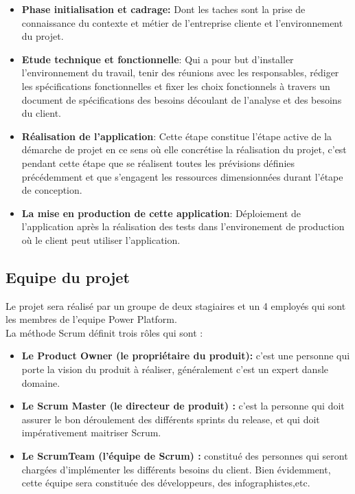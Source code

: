 \begin{itemize}
  \item \textbf{Phase initialisation et cadrage: }
        Dont les taches sont la prise de connaissance du contexte et métier de
        l’entreprise cliente et l’environnement du projet.
    \\
    \item \textbf{Etude technique et fonctionnelle}: 
        Qui a pour but d’installer l’environnement du travail, tenir des réunions avec les responsables, rédiger les spécifications fonctionnelles et fixer les choix fonctionnels à travers un document de spécifications des besoins découlant de l’analyse et des besoins du client.
    \\    
    \item \textbf{Réalisation de l’application}: 
        Cette étape constitue l'étape active de la démarche de projet en ce sens où
        elle concrétise la réalisation du projet, c'est pendant cette étape que se réalisent toutes les prévisions définies précédemment et que s'engagent les ressources dimensionnées durant l'étape de conception.
    \\    
    \item \textbf{La mise en production de cette application}: 
        Déploiement de l’application après la réalisation des tests dans l'environement de production où le client peut utiliser l’application.
    \\    

\end{itemize}

\subsection{Equipe du projet}
Le projet sera réalisé par un groupe de deux stagiaires et un 4 employés qui sont les membres de l'equipe Power Platform. 
\\

La méthode Scrum définit trois rôles qui sont :
\\

\begin{itemize}
  \item \textbf{Le Product Owner (le propriétaire du produit):}
        c’est une personne qui porte la vision du produit à réaliser, généralement c’est un expert dansle domaine.
    \\
    \item \textbf{Le Scrum Master (le directeur de produit) :}
        c'est la personne qui doit assurer le bon déroulement des différents sprints du release, et qui doit impérativement maitriser Scrum.
    \\    
    \item \textbf{Le ScrumTeam (l’équipe de Scrum) :}
        constitué des personnes qui seront
        chargées d’implémenter les différents besoins du client. Bien
        évidemment, cette équipe sera constituée des développeurs, des
        infographistes,etc.
    \\    

\end{itemize}

